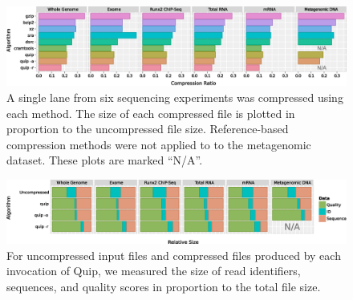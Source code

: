 \documentclass[a4,center,fleqn]{NAR}
\begin{document}
\begin{table}
\end{table}


\begin{figure}
\begin{center}
\includegraphics[width=\textwidth]{sizes.eps}
\end{center}
\caption{
A single lane from six sequencing experiments was compressed using each
method. The size of each compressed file is plotted in proportion to the
uncompressed file size. Reference-based compression methods were not applied to
to the metagenomic dataset. These plots are marked ``N/A''.
}
\label{fig:sizes}
\end{figure}


\begin{figure}
\centerline{\includegraphics[width=\textwidth]{relative_sizes.eps}}
\caption{For uncompressed input files and compressed files produced by each invocation of Quip, we measured the size of read identifiers, sequences, and quality scores in proportion to the total file size.}
\label{fig:relative_sizes}
\end{figure}
\end{document}
